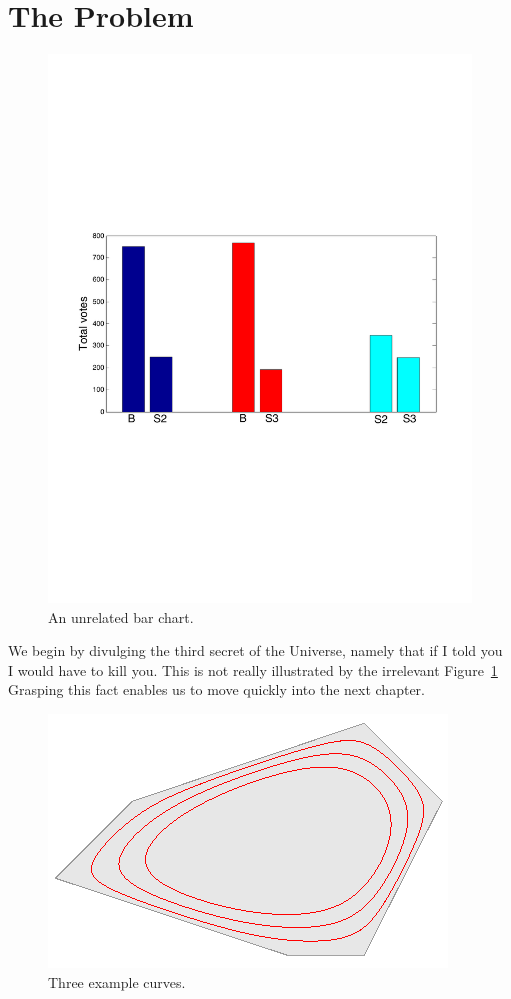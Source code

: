 \documentclass[11pt]{report}
\begin{document}
\section{The Problem}
\label{sec:problem}
\begin{figure}[htb]
  \centering
    \includegraphics[width=.8\linewidth]{images/allComparison.pdf}
  \caption{\label{fig:all}
           An unrelated bar chart.}
\end{figure}

We begin by divulging the third secret of the Universe, namely that if I told you I would have to kill you.
This is not really illustrated by the irrelevant Figure~\ref{fig:all}
Grasping this fact enables us to move quickly into the next chapter.

\begin{figure}[htb]
  \centering
    \includegraphics[width=.8\linewidth]{images/unweightedlog6.png}
  \caption{\label{fig:unweightedlog6}
           Three example curves.}
\end{figure}
\end{document}
